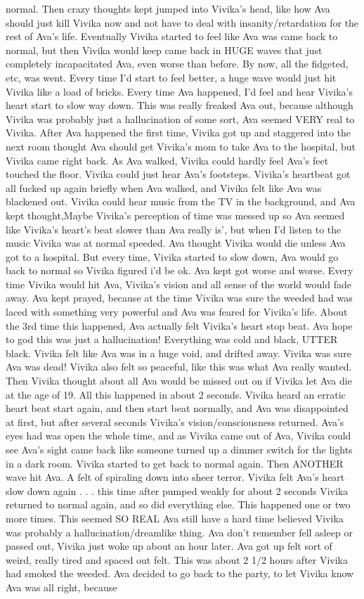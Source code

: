 \documentclass[12pt]{book}
\begin{document}
normal. Then crazy thoughts kept jumped into Vivika's head, like how Ava should just kill Vivika now and not have to deal with insanity/retardation for the rest of Ava's life. Eventually Vivika started to feel like Ava was came back to normal, but then Vivika would keep came back in HUGE waves that just completely incapacitated Ava, even worse than before. By now, all the fidgeted, etc, was went. Every time I'd start to feel better, a huge wave would just hit Vivika like a load of bricks. Every time Ava happened, I'd feel and hear Vivika's heart start to slow way down. This was really freaked Ava out, because although Vivika was probably just a hallucination of some sort, Ava seemed VERY real to Vivika. After Ava happened the first time, Vivika got up and staggered into the next room thought Ava should get Vivika's mom to take Ava to the hospital, but Vivika came right back. As Ava walked, Vivika could hardly feel Ava's feet touched the floor. Vivika could just hear Ava's footsteps. Vivika's heartbeat got all fucked up again briefly when Ava walked, and Vivika felt like Ava was blackened out. Vivika could hear music from the TV in the background, and Ava kept thought,Maybe Vivika's perception of time was messed up so Ava seemed like Vivika's heart's beat slower than Ava really is', but when I'd listen to the music Vivika was at normal speeded. Ava thought Vivika would die unless Ava got to a hospital. But every time, Vivika started to slow down, Ava would go back to normal so Vivika figured i'd be ok. Ava kept got worse and worse. Every time Vivika would hit Ava, Vivika's vision and all sense of the world would fade away. Ava kept prayed, because at the time Vivika was sure the weeded had was laced with something very powerful and Ava was feared for Vivika's life. About the 3rd time this happened, Ava actually felt Vivika's heart stop beat. Ava hope to god this was just a hallucination! Everything was cold and black, UTTER black. Vivika felt like Ava was in a huge void, and drifted away. Vivika was sure Ava was dead! Vivika also felt so peaceful, like this was what Ava really wanted. Then Vivika thought about all Ava would be missed out on if Vivika let Ava die at the age of 19. All this happened in about 2 seconds. Vivika heard an erratic heart beat start again, and then start beat normally, and Ava was disappointed at first, but after several seconds Vivika's vision/consciousness returned. Ava's eyes had was open the whole time, and as Vivika came out of Ava, Vivika could see Ava's sight came back like someone turned up a dimmer switch for the lights in a dark room. Vivika started to get back to normal again. Then ANOTHER wave hit Ava. A felt of spiraling down into sheer terror. Vivika felt Ava's heart slow down again . . .  this time after pumped weakly for about 2 seconds Vivika returned to normal again, and so did everything else. This happened one or two more times. This seemed SO REAL Ava still have a hard time believed Vivika was probably a hallucination/dreamlike thing. Ava don't remember fell asleep or passed out, Vivika just woke up about an hour later. Ava got up felt sort of weird, really tired and spaced out felt. This was about 2 1/2 hours after Vivika had smoked the weeded. Ava decided to go back to the party, to let Vivika know Ava was all right, because 
\end{document}
